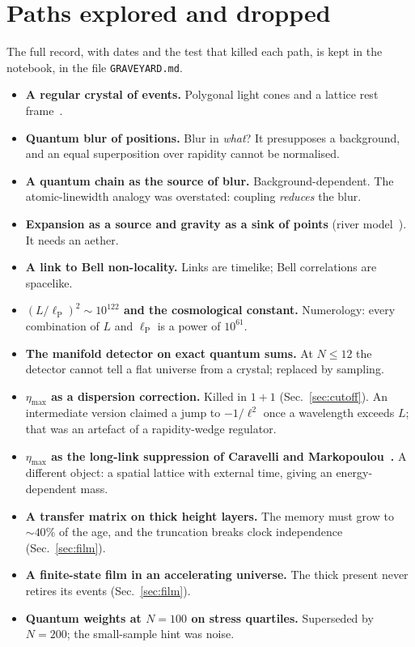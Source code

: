 \documentclass[11pt,a4paper]{article}
\newcommand{\lP}{\ell_{\mathrm P}}
\begin{document}
\section{Paths explored and dropped}\label{app:dropped}
The full record, with dates and the test that killed each path, is kept in the notebook, in the file \texttt{GRAVEYARD.md}.
\begin{itemize}[leftmargin=*,itemsep=1pt]
\item \textbf{A regular crystal of events.} Polygonal light cones and a lattice rest frame~\cite{Burago,Weyl}.
\item \textbf{Quantum blur of positions.} Blur in \emph{what}? It presupposes a background, and an equal superposition over rapidity cannot be normalised.
\item \textbf{A quantum chain as the source of blur.} Background-dependent. The atomic-linewidth analogy was overstated: coupling \emph{reduces} the blur.
\item \textbf{Expansion as a source and gravity as a sink of points} (river model~\cite{HamiltonLisle08}). It needs an aether.
\item \textbf{A link to Bell non-locality.} Links are timelike; Bell correlations are spacelike.
\item \textbf{$(L/\lP)^2\sim10^{122}$ and the cosmological constant.} Numerology: every combination of $L$ and $\lP$ is a power of $10^{61}$.
\item \textbf{The manifold detector on exact quantum sums.} At $N\le12$ the detector cannot tell a flat universe from a crystal; replaced by sampling.
\item \textbf{$\eta_{\max}$ as a dispersion correction.} Killed in $1+1$ (Sec.~\ref{sec:cutoff}). An intermediate version claimed a jump to $-1/\ell^2$ once a wavelength exceeds $L$; that was an artefact of a rapidity-wedge regulator.
\item \textbf{$\eta_{\max}$ as the long-link suppression of Caravelli and Markopoulou~\cite{CM12}.} A different object: a spatial lattice with external time, giving an energy-dependent mass.
\item \textbf{A transfer matrix on thick height layers.} The memory must grow to $\sim40\%$ of the age, and the truncation breaks clock independence (Sec.~\ref{sec:film}).
\item \textbf{A finite-state film in an accelerating universe.} The thick present never retires its events (Sec.~\ref{sec:film}).
\item \textbf{Quantum weights at $N=100$ on stress quartiles.} Superseded by $N=200$; the small-sample hint was noise.

\end{itemize}
\end{document}
